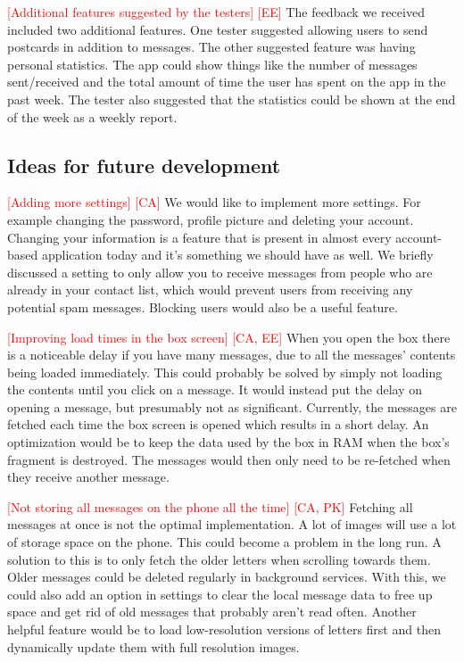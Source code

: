 \documentclass[acmlarge, review=false, screen=true]{acmart}
\begin{document}
      \textcolor{red}{[Additional features suggested by the testers] [EE]} \newline
      The feedback we received included two additional features. One tester suggested allowing users to send postcards in addition to messages. The other suggested feature was having personal statistics. The app could show things like the number of messages sent/received and the total amount of time the user has spent on the app in the past week. The tester also suggested that the statistics could be shown at the end of the week as a weekly report.

    \subsection{Ideas for future development}
      \textcolor{red}{[Adding more settings] [CA]} \newline
      We would like to implement more settings. For example changing the password, profile picture and deleting your account. Changing your information is a feature that is present in almost every account-based application today and it’s something we should have as well. We briefly discussed a setting to only allow you to receive messages from people who are already in your contact list, which would prevent users from receiving any potential spam messages. Blocking users would also be a useful feature.

      \textcolor{red}{[Improving load times in the box screen] [CA, EE]} \newline
      When you open the box there is a noticeable delay if you have many messages, due to all the messages’ contents being loaded immediately. This could probably be solved by simply not loading the contents until you click on a message. It would instead put the delay on opening a message, but presumably not as significant. Currently, the messages are fetched each time the box screen is opened which results in a short delay. An optimization would be to keep the data used by the box in RAM when the box’s fragment is destroyed. The messages would then only need to be re-fetched when they receive another message. 

      \textcolor{red}{[Not storing all messages on the phone all the time] [CA, PK]} \newline
      Fetching all messages at once is not the optimal implementation. A lot of images will use a lot of storage space on the phone. This could become a problem in the long run. A solution to this is to only fetch the older letters when scrolling towards them. Older messages could be deleted regularly in background services. With this, we could also add an option in settings to clear the local message data to free up space and get rid of old messages that probably aren’t read often. Another helpful feature would be to load low-resolution versions of letters first and then dynamically update them with full resolution images.
\end{document}
